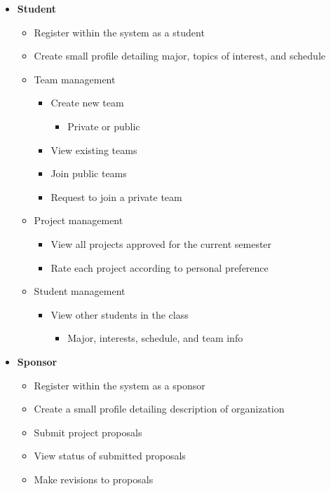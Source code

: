 \documentclass[12pt]{article}
\begin{document}
\begin{itemize}
	\item \textbf{Student}
	\begin{itemize}
		\item Register within the system as a student
		\item Create small profile detailing major, topics of interest, and schedule
		\item Team management
		\begin{itemize}
			\item Create new team
			\begin{itemize}
				\item Private or public
			\end{itemize}
			\item View existing teams
			\item Join public teams
			\item Request to join a private team
		\end{itemize}
		\item Project management
		\begin{itemize}
			\item View all projects approved for the current semester
			\item Rate each project according to personal preference
		\end{itemize}
		\item Student management
		\begin{itemize}
			\item View other students in the class
			\begin{itemize}
				\item Major, interests, schedule, and team info
			\end{itemize}
		\end{itemize}
	\end{itemize}

	\item \textbf{Sponsor}
	\begin{itemize}
		\item Register within the system as a sponsor
		\item Create a small profile detailing description of organization
		\item Submit project proposals
		\item View status of submitted proposals
		\item Make revisions to proposals
	\end{itemize}


\end{itemize}
\end{document}
